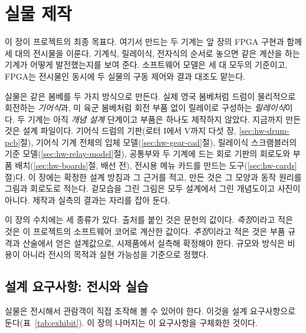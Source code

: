 \chapter{실물 제작}\label{ch:hardware}

이 장이 프로젝트의 최종 목표다. 여기서 만드는 두 기계는 앞 장의 FPGA 구현과 함께 세 대의 전시물을 이룬다.
기계식, 릴레이식, 전자식의 순서로 놓으면 같은 계산을 하는 기계가 어떻게 발전했는지를 보여 준다.
소프트웨어 모델은 세 대 모두의 기준이고, FPGA는 전시물인 동시에 두 실물의 구동 제어와 결과 대조도 맡는다.

실물은 같은 봄베를 두 가지 방식으로 만든다. 실제 영국 봄베처럼 드럼이 물리적으로 회전하는 \emph{기어식}과,
미 육군 봄베처럼 회전 부품 없이 릴레이로 구성하는 \emph{릴레이식}이다. 두 기계는 아직 \emph{개념 설계}
단계이고 부품은 하나도 제작하지 않았다. 지금까지 만든 것은 설계 파일이다. 기어식 드럼의 기판(로터 I에서
V까지 다섯 장, \ref{sec:hw-drum-pcb}절), 기어식 기계 전체의 입체 모델(\ref{sec:hw-gear-cad}절), 릴레이식
스크램블러의 기준 모델(\ref{sec:hw-relay-model}절), 공통부와 두 기계에 드는 회로 기판의 회로도와 부품
배치(\ref{sec:hw-boards}절, 배선 전), 전시용 메뉴 카드를 만드는 도구(\ref{sec:hw-cards}절)다. 이 장에는 확정한 설계 방침과 그 근거를 적고, 만든
것은 그 모양과 동작 원리를 그림과 회로도로 적는다. 겉모습을 그린 그림은 모두 설계에서 그린 개념도이고
사진이 아니다. 제작과 실측의 결과는 자리를 잡아 둔다.

이 장의 수치에는 세 종류가 있다. 출처를 붙인 것은 문헌의 값이다. \emph{측정}이라고 적은 것은 이 프로젝트의
소프트웨어 코어로 계산한 값이다. \emph{추정}이라고 적은 것은 부품 규격과 산술에서 얻은 설계값으로, 시제품에서
실측해 확정해야 한다. 규모와 방식은 비용이 아니라 전시의 목적과 실현 가능성을 기준으로 정했다.

\section{설계 요구사항: 전시와 실습}

실물은 전시해서 관람객이 직접 조작해 볼 수 있어야 한다. 이것을 설계 요구사항으로 둔다(표~\ref{tab:exhibit}).
이 장의 나머지는 이 요구사항을 구체화한 것이다.


